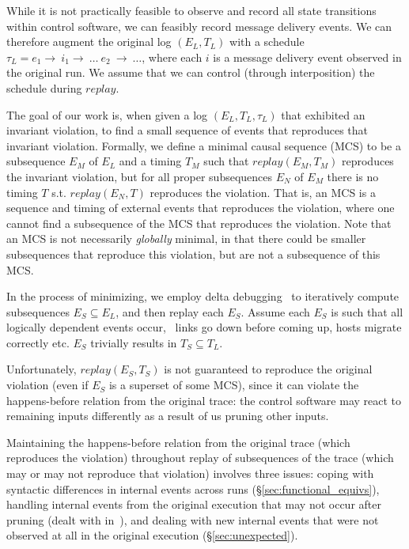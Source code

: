 While it is not practically feasible to observe and record all state
transitions within control software, we can feasibly record message delivery
events. We can therefore augment the original log $(E_L, T_L)$ with a schedule
$\tau_L = e_1\rightarrow~i_1\rightarrow~\dots~e_2~\rightarrow~\dots$, where
each $i$ is a message delivery event observed in the original run.
We assume that we can control (through interposition) the schedule during
$replay$.

 The goal of our work is, when given a log $(E_L,
T_L, \tau_L)$ that exhibited an
invariant violation, to find a small sequence of events that reproduces that
invariant violation. Formally, we define a minimal causal sequence (MCS)
to be a subsequence $E_M$
of $E_L$ and a timing $T_M$ such
that $replay(E_M,T_M)$ reproduces the invariant violation, but for all proper
subsequences $E_N$ of $E_M$
there is no timing $T$ s.t. $replay(E_N,T)$ reproduces the violation.
That is, an MCS is a sequence and timing of external events that reproduces the violation,
where one cannot find a subsequence of the MCS that reproduces the violation.
Note that an MCS is not necessarily {\em globally} minimal, in that there could be smaller
subsequences that reproduce this violation, but are not a subsequence of this MCS.

In the process of minimizing, we employ delta debugging~\cite{Zeller:1999:YMP:318773.318946}
to iteratively compute
subsequences $E_S\subseteq E_L$, and then replay each $E_S$. Assume each $E_S$ is such
that all logically dependent events occur, \eg~links go down before coming up,
hosts migrate correctly etc. $E_S$ trivially results in
$T_S\subseteq T_L$.

Unfortunately, $replay(E_S, T_S)$ is not guaranteed to reproduce the
original violation (even if $E_S$ is a superset of some MCS), since it can violate
the happens-before relation from the original trace: the control software may react to remaining inputs
differently as a result of us
pruning other inputs.

Maintaining the happens-before relation from the original trace
(which reproduces the violation) throughout replay of subsequences of the
trace (which may or may not reproduce that
violation) involves three issues: coping with syntactic differences in internal
events across runs (\S\ref{sec:functional_equivs}),
handling internal events from the original
execution that may not occur after pruning (dealt with in~\cite{sts}),
and dealing with new internal events that were not
observed at all in the original execution (\S\ref{sec:unexpected}).

